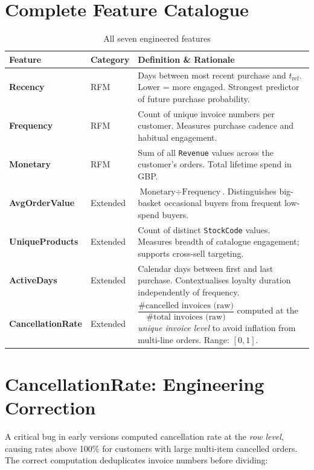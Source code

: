 \documentclass[12pt,a4paper]{report}
\begin{document}
\section{Complete Feature Catalogue}

\begin{table}[H]
\centering
\caption{All seven engineered features}
\begin{tabularx}{\textwidth}{llX}
\toprule
\textbf{Feature} & \textbf{Category} & \textbf{Definition \& Rationale} \\
\midrule
\textbf{Recency} & RFM & Days between most recent purchase and $t_\text{ref}$. Lower = more engaged. Strongest predictor of future purchase probability. \\[4pt]
\textbf{Frequency} & RFM & Count of unique invoice numbers per customer. Measures purchase cadence and habitual engagement. \\[4pt]
\textbf{Monetary} & RFM & Sum of all \texttt{Revenue} values across the customer's orders. Total lifetime spend in GBP. \\[4pt]
\textbf{AvgOrderValue} & Extended & $\text{Monetary} \div \text{Frequency}$. Distinguishes big-basket occasional buyers from frequent low-spend buyers. \\[4pt]
\textbf{UniqueProducts} & Extended & Count of distinct \texttt{StockCode} values. Measures breadth of catalogue engagement; supports cross-sell targeting. \\[4pt]
\textbf{ActiveDays} & Extended & Calendar days between first and last purchase. Contextualises loyalty duration independently of frequency. \\[4pt]
\textbf{CancellationRate} & Extended & $\dfrac{\text{\# cancelled invoices (raw)}}{\text{\# total invoices (raw)}}$ computed at the \emph{unique invoice level} to avoid inflation from multi-line orders. Range: $[0,1]$. \\
\bottomrule
\end{tabularx}
\end{table}

\section{CancellationRate: Engineering Correction}

A critical bug in early versions computed cancellation rate at the \emph{row level}, causing rates above 100\% for customers with large multi-item cancelled orders. The correct computation deduplicates invoice numbers before dividing:
\end{document}
